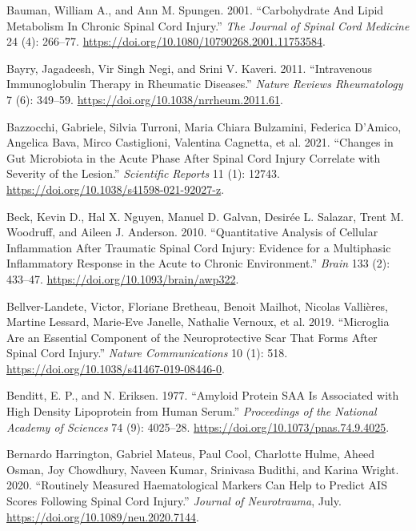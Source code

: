 \documentclass[9pt,lineno]{elife}
\newlength{\cslhangindent}
\newlength{\cslentryspacingunit} %
\newenvironment{CSLReferences}[2] %
 {%
  \setlength{\parindent}{0pt}
  \ifodd #1
  \let\oldpar\par
  \def\par{\hangindent=\cslhangindent\oldpar}
  \fi
  \setlength{\parskip}{#2\cslentryspacingunit}
 }%
 {}
\begin{document}
\begin{CSLReferences}{1}{0}
\leavevmode{}%
Bauman, William A., and Ann M. Spungen. 2001. {``Carbohydrate {And Lipid Metabolism In Chronic Spinal Cord Injury}.''} \emph{The Journal of Spinal Cord Medicine} 24 (4): 266--77. \url{https://doi.org/10.1080/10790268.2001.11753584}.

\leavevmode{}%
Bayry, Jagadeesh, Vir Singh Negi, and Srini V. Kaveri. 2011. {``Intravenous Immunoglobulin Therapy in Rheumatic Diseases.''} \emph{Nature Reviews Rheumatology} 7 (6): 349--59. \url{https://doi.org/10.1038/nrrheum.2011.61}.

\leavevmode{}%
Bazzocchi, Gabriele, Silvia Turroni, Maria Chiara Bulzamini, Federica D'Amico, Angelica Bava, Mirco Castiglioni, Valentina Cagnetta, et al. 2021. {``Changes in Gut Microbiota in the Acute Phase After Spinal Cord Injury Correlate with Severity of the Lesion.''} \emph{Scientific Reports} 11 (1): 12743. \url{https://doi.org/10.1038/s41598-021-92027-z}.

\leavevmode{}%
Beck, Kevin D., Hal X. Nguyen, Manuel D. Galvan, Desirée L. Salazar, Trent M. Woodruff, and Aileen J. Anderson. 2010. {``Quantitative Analysis of Cellular Inflammation After Traumatic Spinal Cord Injury: Evidence for a Multiphasic Inflammatory Response in the Acute to Chronic Environment.''} \emph{Brain} 133 (2): 433--47. \url{https://doi.org/10.1093/brain/awp322}.

\leavevmode{}%
Bellver-Landete, Victor, Floriane Bretheau, Benoit Mailhot, Nicolas Vallières, Martine Lessard, Marie-Eve Janelle, Nathalie Vernoux, et al. 2019. {``Microglia Are an Essential Component of the Neuroprotective Scar That Forms After Spinal Cord Injury.''} \emph{Nature Communications} 10 (1): 518. \url{https://doi.org/10.1038/s41467-019-08446-0}.

\leavevmode{}%
Benditt, E. P., and N. Eriksen. 1977. {``Amyloid Protein {SAA} Is Associated with High Density Lipoprotein from Human Serum.''} \emph{Proceedings of the National Academy of Sciences} 74 (9): 4025--28. \url{https://doi.org/10.1073/pnas.74.9.4025}.

\leavevmode{}%
Bernardo Harrington, Gabriel Mateus, Paul Cool, Charlotte Hulme, Aheed Osman, Joy Chowdhury, Naveen Kumar, Srinivasa Budithi, and Karina Wright. 2020. {``Routinely Measured Haematological Markers Can Help to Predict {AIS} Scores Following Spinal Cord Injury.''} \emph{Journal of Neurotrauma}, July. \url{https://doi.org/10.1089/neu.2020.7144}.


\end{CSLReferences}
\end{document}
